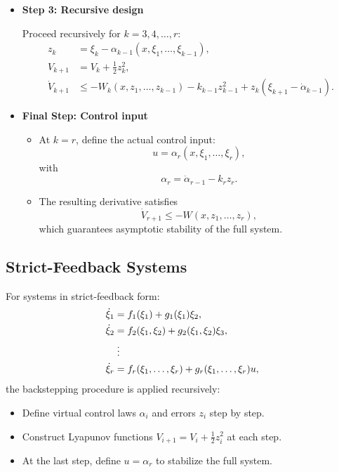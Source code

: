 \begin{itemize}
\item\textbf{Step 3: Recursive design}

Proceed recursively for $k=3,4,\dots,r$:
\begin{align}
    z_k &= \xi_k - \alpha_{k-1}(x,\xi_1,\dots,\xi_{k-1}), \\
    V_{k+1} &= V_k + \frac{1}{2} z_k^2, \\
    \dot{V}_{k+1} &\leq - W_k(x, z_1, \dots, z_{k-1}) - k_{k-1} z_{k-1}^2 + z_k(\xi_{k+1} - \dot{\alpha}_{k-1}).
\end{align}

\item\textbf{Final Step: Control input}

\begin{itemize}
    \item At $k=r$, define the actual control input:
    \begin{equation}
        u = \alpha_r(x, \xi_1, \dots, \xi_r),
    \end{equation}
    with
    \begin{equation}
        \alpha_r = \dot{\alpha}_{r-1} - k_r z_r.
    \end{equation}
    \item The resulting derivative satisfies
    \begin{equation}
        \dot{V}_{r+1} \leq - W(x, z_1, \dots, z_r),
    \end{equation}
    which guarantees asymptotic stability of the full system.
\end{itemize}
\end{itemize}

\subsection{Strict-Feedback Systems}

For systems in strict-feedback form:
\begin{align}
    \dot{\xi}_1 &= f_1(\xi_1) + g_1(\xi_1) \xi_2, \\
    \dot{\xi}_2 &= f_2(\xi_1, \xi_2) + g_2(\xi_1, \xi_2) \xi_3, \\
    &\;\vdots \notag\\
    \dot{\xi}_r &= f_r(\xi_1, \dots, \xi_r) + g_r(\xi_1, \dots, \xi_r) u,
\end{align}
the backstepping procedure is applied recursively:
\begin{itemize}
    \item Define virtual control laws $\alpha_i$ and errors $z_i$ step by step.
    \item Construct Lyapunov functions $V_{i+1} = V_i + \frac{1}{2} z_i^2$ at each step.
    \item At the last step, define $u = \alpha_r$ to stabilize the full system.
\end{itemize}

